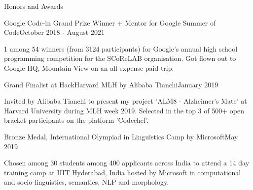 \documentclass[
	a4paper, %
    10pt, %
]{resume} %
\begin{document}


\begin{rSection}{Honors and Awards}

	\begin{achSubsection}{Google Code-in Grand Prize Winner + Mentor for Google Summer of Code}{October 2018 - August 2021}
		\item 1 among 54 winners (from 3124 participants) for Google's annual high school programming competition for the SCoReLAB organisation. Got flown out to Google HQ, Mountain View on an all-expense paid trip.
	\end{achSubsection}




	\begin{achSubsection}{Grand Finalist at HackHarvard MLH by Alibaba Tianchi}{January 2019}
		\item Invited by Alibaba Tianchi to present my project 'ALM8 - Alzheimer's Mate' at Harvard University during MLH week 2019. Selected in the top 3 of 500+ open bracket participants on the platform 'Codechef'.
	\end{achSubsection}


	\begin{achSubsection}{Bronze Medal, International Olympiad in Linguistics Camp by Microsoft}{May 2019}
		\item Chosen among 30 students among 400 applicants across India to attend a 14 day training camp at IIIT Hyderabad, India hosted by Microsoft in computational and socio-linguistics, semantics, NLP and morphology.
	\end{achSubsection}

\end{rSection}




\end{document}
